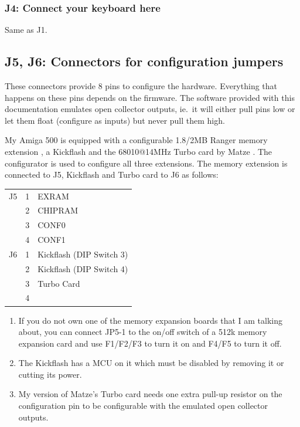 \documentclass[DIV10]{scrartcl}
\begin{document}
\subsubsection{J4:  Connect your keyboard here}
Same as J1.

\subsection{J5, J6: Connectors for configuration jumpers}
\label{sec:config-jumpers}
These connectors provide 8 pins to configure the hardware. Everything
that happens on these pins depends on the firmware. The software
provided with this documentation emulates open collector outputs, ie.\
it will either pull pins low or let them float (configure as inputs)
but never pull them high.

My Amiga 500 is equipped with a configurable 1.8/2MB Ranger memory
extension \cite{Memory}, a Kickflash \cite{Kickflash-Thread,Kickflash-Manual} and
the 68010@14MHz Turbo card by Matze \cite{Turbokarte}. The 
configurator is used to configure all three extensions. The memory
extension is connected to J5, Kickflash and Turbo card to J6 as
follows:
\begin{center}
  \begin{tabular}{|ll|l|}
    \hline
    J5 & 1 & EXRAM \\
    & 2 & CHIPRAM \\
    & 3 & CONF0 \\
    & 4 & CONF1 \\
    \hline
    J6 & 1 & Kickflash (DIP Switch 3) \\
    & 2 & Kickflash (DIP Switch 4) \\
    & 3 & Turbo Card \\
    & 4 &
    \\ \hline
  \end{tabular}
\end{center}
\begin{enumerate}[Note 1:]
\item \label{item:remark-memory} If you do not own one of the memory expansion boards that I am
  talking about, you can connect JP5-1 to the on/off switch of a 512k
  memory expansion card and use F1/F2/F3 to turn it on and F4/F5 to
  turn it off.
\item The Kickflash has a MCU on it which must be disabled by removing
  it or cutting its power.
\item My version of Matze's Turbo card needs one extra pull-up
  resistor on the configuration pin to be configurable with the emulated
  open collector outputs.
\end{enumerate}
\end{document}
